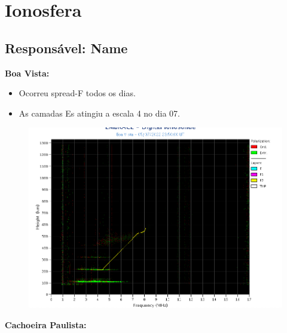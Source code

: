 \documentclass[a4paper, 10pt]{article}
\begin{document}
\section{Ionosfera} 
 \subsection{Responsável: Name} 
 
\textbf{Boa Vista: }

 \begin{itemize}
\item Ocorreu spread-F todos os dias.
\item As camadas Es atingiu a escala 4 no dia 07.
\end{itemize}
\begin{figure}[H]
    \centering
    \includegraphics[width=14cm]{./figures//BoaVista.png}
\end{figure}

\textbf{Cachoeira Paulista:}
\end{document}
